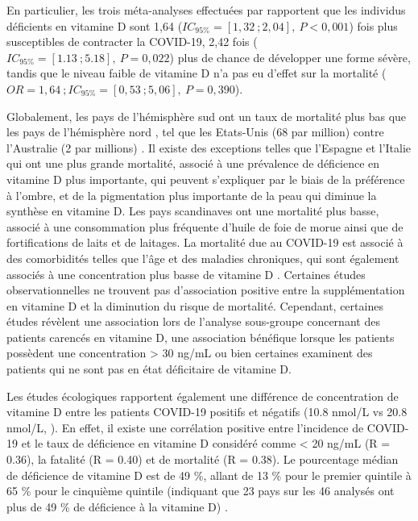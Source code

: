 \documentclass[
  a4paper,
  DIV=11,
  numbers=noendperiod,
  listof=totoc]{scrreprt}
\begin{document}
En particulier, les trois méta-analyses effectuées par
\textcite{Kaya.2021} rapportent que les individus déficients en vitamine
D sont 1,64 (\(IC_{95\%} = [1,32\ ; 2,04],\ P < 0,001\)) fois plus
susceptibles de contracter la COVID-19, 2,42 fois
(\(IC_{95\%} = [1.13\ ; 5.18],\ P = 0,022\)) plus de chance de
développer une forme sévère, tandis que le niveau faible de vitamine D
n'a pas eu d'effet sur la mortalité
(\(OR = 1,64\ ; IC_{95\%} = [0,53\ ; 5,06],\ P = 0,390\)).

Globalement, les pays de l'hémisphère sud ont un taux de mortalité plus
bas que les pays de l'hémisphère nord \autocite{Contreras-Bolívar.2023},
tel que les Etats-Unis (68 par million) contre l'Australie (2 par
millions) \autocite{Bishop.2021}. Il existe des exceptions telles que
l'Espagne et l'Italie qui ont une plus grande mortalité, associé à une
prévalence de déficience en vitamine D plus importante, qui peuvent
s'expliquer par le biais de la préférence à l'ombre, et de la
pigmentation plus importante de la peau qui diminue la synthèse en
vitamine D. Les pays scandinaves ont une mortalité plus basse, associé à
une consommation plus fréquente d'huile de foie de morue ainsi que de
fortifications de laits et de laitages. La mortalité due au COVID-19 est
associé à des comorbidités telles que l'âge et des maladies chroniques,
qui sont également associés à une concentration plus basse de vitamine D
\autocite{Bishop.2021}. Certaines études observationnelles ne trouvent
pas d'association positive entre la supplémentation en vitamine D et la
diminution du risque de mortalité. Cependant, certaines études révèlent
une association lors de l'analyse sous-groupe concernant des patients
carencés en vitamine D, une association bénéfique lorsque les patients
possèdent une concentration \textgreater{} 30 ng/mL
\autocite{Oristrell.2022} ou bien certaines examinent des patients qui
ne sont pas en état déficitaire de vitamine D.

Les études écologiques rapportent également une différence de
concentration de vitamine D entre les patients COVID-19 positifs et
négatifs (10.8 nmol/L vs 20.8 nmol/L, \textcite{Baktash.2021}). En
effet, il existe une corrélation positive entre l'incidence de COVID-19
et le taux de déficience en vitamine D considéré comme \textless{} 20
ng/mL (R = 0.36), la fatalité (R = 0.40) et de mortalité (R = 0.38). Le
pourcentage médian de déficience de vitamine D est de 49 \%, allant de
13 \% pour le premier quintile à 65 \% pour le cinquième quintile
(indiquant que 23 pays sur les 46 analysés ont plus de 49 \% de
déficience à la vitamine D) \autocite{Mariani.2021}.
\end{document}
